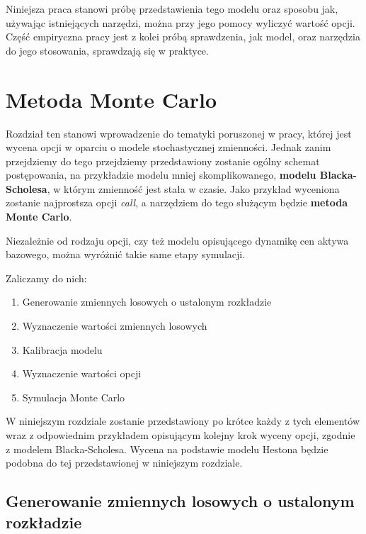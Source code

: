 \documentclass{pracamgr}
\begin{document}
Niniejsza praca stanowi próbę przedstawienia tego modelu oraz sposobu jak, używając istniejących narzędzi,
można przy jego pomocy wyliczyć wartość opcji. Część empiryczna pracy jest z kolei próbą sprawdzenia, jak 
model, oraz narzędzia do jego stosowania, sprawdzają się w praktyce.


\chapter{Metoda Monte Carlo}
\label{chap:introduction}


 
 

Rozdział ten stanowi wprowadzenie do tematyki poruszonej w pracy, której jest wycena opcji w oparciu
o modele stochastycznej zmienności. 
Jednak zanim przejdziemy do tego przejdziemy przedstawiony zostanie ogólny schemat postępowania, na przykładzie modelu mniej skomplikowanego, \textbf{modelu Blacka-Scholesa}, w którym zmienność jest stała w czasie.
Jako przykład wyceniona zostanie najprostsza opcji \textit{call}, a narzędziem do tego służącym 
będzie \textbf{metoda Monte Carlo}.

Niezależnie od rodzaju opcji, czy też modelu opisującego dynamikę cen aktywa bazowego, można 
wyróżnić takie same etapy symulacji. 

Zaliczamy do nich:
\begin{enumerate}
  \item Generowanie zmiennych losowych o ustalonym rozkładzie
  \item Wyznaczenie wartości zmiennych losowych
  \item Kalibracja modelu
  \item Wyznaczenie wartości opcji
  \item Symulacja Monte Carlo
\end{enumerate}

W niniejszym rozdziale zostanie przedstawiony po krótce każdy z tych elementów wraz z odpowiednim przykładem opisującym kolejny krok wyceny opcji, zgodnie z modelem Blacka-Scholesa.
Wycena na podstawie modelu Hestona będzie podobna do tej przedstawionej w niniejszym rozdziale.

\section{Generowanie zmiennych losowych o ustalonym rozkładzie}
\end{document}
